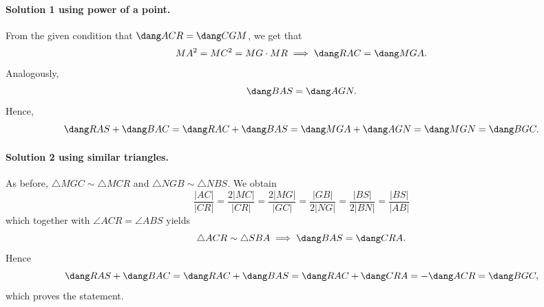 \documentclass[11pt]{scrartcl}
\begin{document}
\paragraph{Solution 1 using power of a point.}
From the given condition that $\dang ACR = \dang CGM$, we get that
\[ MA^2 = MC^2 = MG \cdot MR \implies \dang RAC = \dang MGA. \]
Analogously,
\[ \dang BAS = \dang AGN. \]
Hence,
\[
  \dang RAS + \dang BAC
  = \dang RAC + \dang BAS
  = \dang MGA + \dang AGN = \dang MGN = \dang BGC.
\]

\paragraph{Solution 2 using similar triangles.}
As before, $\triangle MGC \sim \triangle MCR$ and $\triangle NGB \sim \triangle NBS$.
We obtain
\[
  \frac{|AC|}{|CR|} = \frac{2|MC|}{|CR|} = \frac{2|MG|}{|GC|}
  = \frac{|GB|}{2|NG|} = \frac{|BS|}{2|BN|} = \frac{|BS|}{|AB|}
\]
which together with $\angle ACR = \angle ABS$ yields
\[ \triangle ACR \sim \triangle SBA \implies \dang BAS = \dang CRA. \]
Hence
\[
  \dang RAS + \dang BAC = \dang RAC + \dang BAS
  = \dang RAC + \dang CRA = - \dang ACR = \dang BGC,
\]
which proves the statement.
\end{document}
